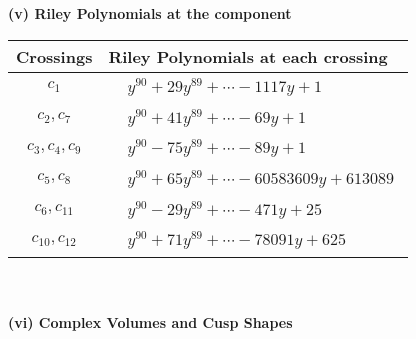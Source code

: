 \documentclass[1p]{elsarticle_modified}
\theoremstyle{definition}
\begin{document}
\newpage\renewcommand{\arraystretch}{1}
\flushleft \textbf{(v) Riley Polynomials at the component}\newline \\
\begin{tabular}{m{50pt}|m{274pt}}
Crossings & \hspace{64pt}Riley Polynomials at each crossing \\
\hline $$\begin{aligned}c_{1}\end{aligned}$$&$\begin{aligned}
&y^{90}+29 y^{89}+\cdots-1117 y+1
\end{aligned}$\\
\hline $$\begin{aligned}c_{2},c_{7}\end{aligned}$$&$\begin{aligned}
&y^{90}+41 y^{89}+\cdots-69 y+1
\end{aligned}$\\
\hline $$\begin{aligned}c_{3},c_{4},c_{9}\end{aligned}$$&$\begin{aligned}
&y^{90}-75 y^{89}+\cdots-89 y+1
\end{aligned}$\\
\hline $$\begin{aligned}c_{5},c_{8}\end{aligned}$$&$\begin{aligned}
&y^{90}+65 y^{89}+\cdots-60583609 y+613089
\end{aligned}$\\
\hline $$\begin{aligned}c_{6},c_{11}\end{aligned}$$&$\begin{aligned}
&y^{90}-29 y^{89}+\cdots-471 y+25
\end{aligned}$\\
\hline $$\begin{aligned}c_{10},c_{12}\end{aligned}$$&$\begin{aligned}
&y^{90}+71 y^{89}+\cdots-78091 y+625
\end{aligned}$\\
\hline
\end{tabular}\\~\\
\newpage\flushleft \textbf{(vi) Complex Volumes and Cusp Shapes}
\end{document}
